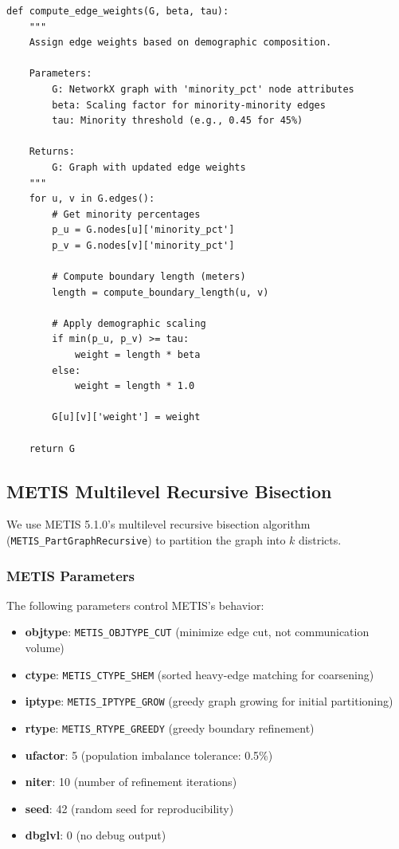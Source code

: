 \begin{verbatim}
def compute_edge_weights(G, beta, tau):
    """
    Assign edge weights based on demographic composition.

    Parameters:
        G: NetworkX graph with 'minority_pct' node attributes
        beta: Scaling factor for minority-minority edges
        tau: Minority threshold (e.g., 0.45 for 45%)

    Returns:
        G: Graph with updated edge weights
    """
    for u, v in G.edges():
        # Get minority percentages
        p_u = G.nodes[u]['minority_pct']
        p_v = G.nodes[v]['minority_pct']

        # Compute boundary length (meters)
        length = compute_boundary_length(u, v)

        # Apply demographic scaling
        if min(p_u, p_v) >= tau:
            weight = length * beta
        else:
            weight = length * 1.0

        G[u][v]['weight'] = weight

    return G
\end{verbatim}

\subsection{METIS Multilevel Recursive Bisection}

We use METIS 5.1.0's multilevel recursive bisection algorithm (\texttt{METIS\_PartGraphRecursive}) to partition the graph into $k$ districts.

\subsubsection{METIS Parameters}

The following parameters control METIS's behavior:

\begin{itemize}
    \item \textbf{objtype}: \texttt{METIS\_OBJTYPE\_CUT} (minimize edge cut, not communication volume)
    \item \textbf{ctype}: \texttt{METIS\_CTYPE\_SHEM} (sorted heavy-edge matching for coarsening)
    \item \textbf{iptype}: \texttt{METIS\_IPTYPE\_GROW} (greedy graph growing for initial partitioning)
    \item \textbf{rtype}: \texttt{METIS\_RTYPE\_GREEDY} (greedy boundary refinement)
    \item \textbf{ufactor}: 5 (population imbalance tolerance: 0.5\%)
    \item \textbf{niter}: 10 (number of refinement iterations)
    \item \textbf{seed}: 42 (random seed for reproducibility)
    \item \textbf{dbglvl}: 0 (no debug output)
\end{itemize}

